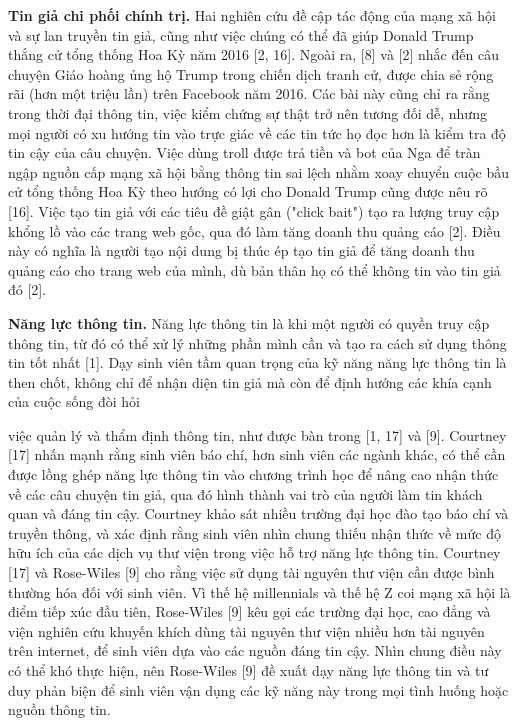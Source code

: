 \textbf{Tin giả chi phối chính trị.} Hai nghiên cứu đề cập tác động của mạng xã hội và sự lan truyền tin giả, cũng như việc chúng có thể đã giúp Donald Trump thắng cử tổng thống Hoa Kỳ năm 2016 {[}2, 16{]}. Ngoài ra, {[}8{]} và {[}2{]} nhắc đến câu chuyện Giáo hoàng ủng hộ Trump trong chiến dịch tranh cử, được chia sẻ rộng rãi (hơn một triệu lần) trên Facebook năm 2016. Các bài này cũng chỉ ra rằng trong thời đại thông tin, việc kiểm chứng sự thật trở nên tương đối dễ, nhưng mọi người có xu hướng tin vào trực giác về các tin tức họ đọc hơn là kiểm tra độ tin cậy của câu chuyện. Việc dùng troll được trả tiền và bot của Nga để tràn ngập nguồn cấp mạng xã hội bằng thông tin sai lệch nhằm xoay chuyển cuộc bầu cử tổng thống Hoa Kỳ theo hướng có lợi cho Donald Trump cũng được nêu rõ {[}16{]}. Việc tạo tin giả với các tiêu đề giật gân ("click bait") tạo ra lượng truy cập khổng lồ vào các trang web gốc, qua đó làm tăng doanh thu quảng cáo {[}2{]}. Điều này có nghĩa là người tạo nội dung bị thúc ép tạo tin giả để tăng doanh thu quảng cáo cho trang web của mình, dù bản thân họ có thể không tin vào tin giả đó {[}2{]}.

\textbf{Năng lực thông tin.} Năng lực thông tin là khi một người có quyền truy cập thông tin, từ đó có thể xử lý những phần mình cần và tạo ra cách sử dụng thông tin tốt nhất {[}1{]}. Dạy sinh viên tầm quan trọng của kỹ năng năng lực thông tin là then chốt, không chỉ để nhận diện tin giả mà còn để định hướng các khía cạnh của cuộc sống đòi hỏi

việc quản lý và thẩm định thông tin, như được bàn trong {[}1, 17{]} và {[}9{]}. Courtney {[}17{]} nhấn mạnh rằng sinh viên báo chí, hơn sinh viên các ngành khác, có thể cần được lồng ghép năng lực thông tin vào chương trình học để nâng cao nhận thức về các câu chuyện tin giả, qua đó hình thành vai trò của người làm tin khách quan và đáng tin cậy. Courtney khảo sát nhiều trường đại học đào tạo báo chí và truyền thông, và xác định rằng sinh viên nhìn chung thiếu nhận thức về mức độ hữu ích của các dịch vụ thư viện trong việc hỗ trợ năng lực thông tin. Courtney {[}17{]} và Rose-Wiles {[}9{]} cho rằng việc sử dụng tài nguyên thư viện cần được bình thường hóa đối với sinh viên. Vì thế hệ millennials và thế hệ Z coi mạng xã hội là điểm tiếp xúc đầu tiên, Rose-Wiles {[}9{]} kêu gọi các trường đại học, cao đẳng và viện nghiên cứu khuyến khích dùng tài nguyên thư viện nhiều hơn tài nguyên trên internet, để sinh viên dựa vào các nguồn đáng tin cậy. Nhìn chung điều này có thể khó thực hiện, nên Rose-Wiles {[}9{]} đề xuất dạy năng lực thông tin và tư duy phản biện để sinh viên vận dụng các kỹ năng này trong mọi tình huống hoặc nguồn thông tin.

